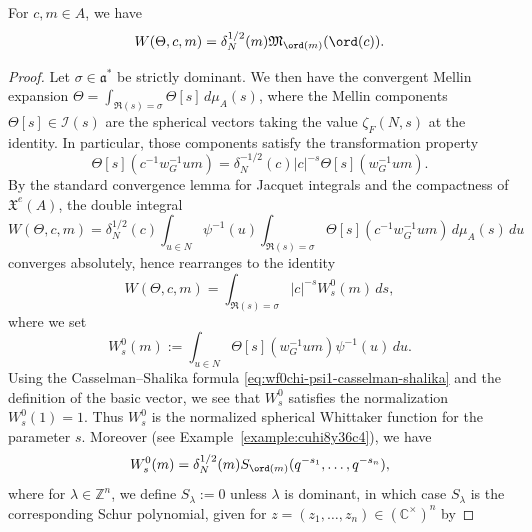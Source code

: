 \begin{lemma}\label{lem:sub-gln:we-have-begin}
  For $c, m \in A$, we have
  \begin{equation*}
    W(\Theta,c,m) = \delta_N^{1/2}(m) \mathfrak{M}_{\ord(m)}(\ord(c)).
  \end{equation*}
\end{lemma}
\begin{proof}
  Let $\sigma \in \mathfrak{a}^*$ be strictly dominant.  We then have the convergent Mellin expansion $\Theta = \int_{\Re(s) = \sigma} \Theta[s] \, d \mu_A(s)$, where the Mellin components $\Theta[s] \in \mathcal{I}(s)$ are the spherical vectors taking the value $\zeta_F(N,s)$ at the identity.  In particular, those components satisfy the transformation property
  \begin{equation}\label{eq:f0sc-1-w_g}
    \Theta[s](c^{-1} w^{-1}_G u m)
    =
    \delta_N^{-1/2}(c) |c|^{- s} \Theta[s](w^{-1}_G u m).
  \end{equation}
  By the standard convergence lemma for Jacquet integrals \cite[\S10.1.2]{MR1170566} and the compactness of $\mathfrak{X}^e(A)$, the double integral
  \begin{equation*}
    W(\Theta, c, m) = \delta_N^{1/2}(c) \int_{u \in N} \psi^{-1}(u) \int_{\Re(s) = \sigma } \Theta[s](c^{-1} w^{-1}_G u m) \, d \mu_A(s) \, d u
  \end{equation*}
  converges absolutely, hence rearranges to the identity
  \begin{equation*}
    W(\Theta,c,m) =
    \int_{\Re(s) = \sigma }
    |c|^{-s}
    W_s^0(m)
    \, d s,
  \end{equation*}
  where we set
  \begin{equation*}
    W_s^0(m) := \int_{u \in N} \Theta[s](w^{-1}_G u m) \psi^{-1}(u) \, d u.
  \end{equation*}
  Using the Casselman--Shalika formula \eqref{eq:wf0chi-psi1-casselman-shalika} and the definition of the basic vector, we see that $W_s^0$ satisfies the normalization $W_s^0(1) = 1$.  Thus $W_s^0$ is the normalized spherical Whittaker function for the parameter $s$.  Moreover (see Example~\ref{example:cuhi8y36c4}), we have
  \begin{equation*}
    W_s^0(m) = \delta_N^{1/2}(m) S_{\ord(m)}(q^{-s_1}, \dotsc, q^{-s_n}),
  \end{equation*}
  where for $\lambda \in \mathbb{Z}^n$, we define $S_\lambda := 0$ unless $\lambda$ is dominant, in which case $S_\lambda$ is the corresponding Schur polynomial, given for $z = (z_1,\dotsc,z_n) \in (\mathbb{C}^\times)^n$ by

\end{proof}
